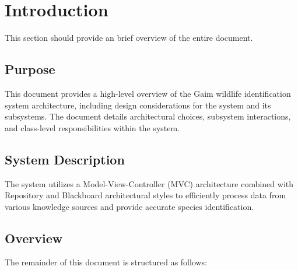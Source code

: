 \documentclass[]{article}
\begin{document}
\newpage
\section{Introduction}
\label{sec:introduction}

This section should provide an brief overview of the entire document.

\subsection{Purpose}
\label{sub:purpose}
This document provides a high-level overview of the Gaim wildlife identification system architecture, including design considerations for the system and its subsystems. The document details architectural choices, subsystem interactions, and class-level responsibilities within the system.\newline


\subsection{System Description}
\label{sub:system_description}
The system utilizes a Model-View-Controller (MVC) architecture combined with Repository and Blackboard architectural styles to efficiently process data from various knowledge sources and provide accurate species identification.\newline




\subsection{Overview}
\label{sub:overview}
The remainder of this document is structured as follows:
\end{document}
